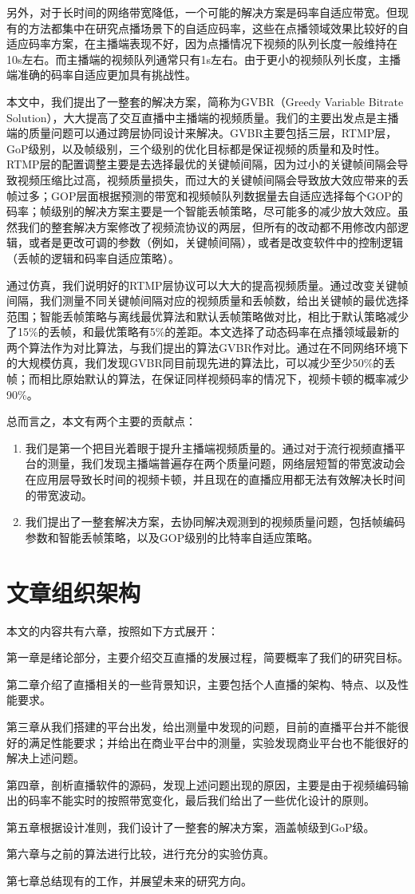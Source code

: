 另外，对于长时间的网络带宽降低，一个可能的解决方案是码率自适应带宽。但现有的方法都集中在研究点播场景下的自适应码率，这些在点播领域效果比较好的自适应码率方案，在主播端表现不好，因为点播情况下视频的队列长度一般维持在10s左右。而主播端的视频队列通常只有1s左右。由于更小的视频队列长度，主播端准确的码率自适应更加具有挑战性。

本文中，我们提出了一整套的解决方案，简称为GVBR（Greedy Variable Bitrate Solution），大大提高了交互直播中主播端的视频质量。我们的主要出发点是主播端的质量问题可以通过跨层协同设计来解决。GVBR主要包括三层，RTMP层，GoP级别，以及帧级别，三个级别的优化目标都是保证视频的质量和及时性。 RTMP层的配置调整主要是去选择最优的关键帧间隔，因为过小的关键帧间隔会导致视频压缩比过高，视频质量损失，而过大的关键帧间隔会导致放大效应带来的丢帧过多；GOP层面根据预测的带宽和视频帧队列数据量去自适应选择每个GOP的码率；帧级别的解决方案主要是一个智能丢帧策略，尽可能多的减少放大效应。虽然我们的整套解决方案修改了视频流协议的两层，但所有的改动都不用修改内部逻辑，或者是更改可调的参数（例如，关键帧间隔），或者是改变软件中的控制逻辑（丢帧的逻辑和码率自适应策略）。

通过仿真，我们说明好的RTMP层协议可以大大的提高视频质量。通过改变关键帧间隔，我们测量不同关键帧间隔对应的视频质量和丢帧数，给出关键帧的最优选择范围；智能丢帧策略与离线最优算法和默认丢帧策略做对比，相比于默认策略减少了15\%的丢帧，和最优策略有5\%的差距。本文选择了动态码率在点播领域最新的两个算法作为对比算法，与我们提出的算法GVBR作对比。通过在不同网络环境下的大规模仿真，我们发现GVBR同目前现先进的算法比，可以减少至少50\%的丢帧；而相比原始默认的算法，在保证同样视频码率的情况下，视频卡顿的概率减少90\%。

总而言之，本文有两个主要的贡献点：
\begin{enumerate}[1)]
  \item 我们是第一个把目光着眼于提升主播端视频质量的。通过对于流行视频直播平台的测量，我们发现主播端普遍存在两个质量问题，网络层短暂的带宽波动会在应用层导致长时间的视频卡顿，并且现在的直播应用都无法有效解决长时间的带宽波动。
  \item 我们提出了一整套解决方案，去协同解决观测到的视频质量问题，包括帧编码参数和智能丢帧策略，以及GOP级别的比特率自适应策略。
\end{enumerate}

\section{文章组织架构}
本文的内容共有六章，按照如下方式展开：

第一章是绪论部分，主要介绍交互直播的发展过程，简要概率了我们的研究目标。

第二章介绍了直播相关的一些背景知识，主要包括个人直播的架构、特点、以及性能要求。

第三章从我们搭建的平台出发，给出测量中发现的问题，目前的直播平台并不能很好的满足性能要求；并给出在商业平台中的测量，实验发现商业平台也不能很好的解决上述问题。

第四章，剖析直播软件的源码，发现上述问题出现的原因，主要是由于视频编码输出的码率不能实时的按照带宽变化，最后我们给出了一些优化设计的原则。

第五章根据设计准则，我们设计了一整套的解决方案，涵盖帧级到GoP级。

第六章与之前的算法进行比较，进行充分的实验仿真。

第七章总结现有的工作，并展望未来的研究方向。

